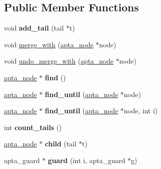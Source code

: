 \subsection*{Public Member Functions}
\begin{DoxyCompactItemize}
\item 
\mbox{\label{classapta__node_aeaf9c860199ae7118e0c4e3cafddcf0a}} 
void {\bfseries add\+\_\+tail} (tail $\ast$t)
\item 
void \hyperlink{classapta__node_aa7ad2ab5e24d47095eb7d7d60f2d1af4}{merge\+\_\+with} (\hyperlink{classapta__node}{apta\+\_\+node} $\ast$node)
\item 
void \hyperlink{classapta__node_aaaa403466a13fa9a8884c36a242ff49d}{undo\+\_\+merge\+\_\+with} (\hyperlink{classapta__node}{apta\+\_\+node} $\ast$node)
\item 
\mbox{\label{classapta__node_a5d339a47f63e54193f2d384244c8d61d}} 
\hyperlink{classapta__node}{apta\+\_\+node} $\ast$ {\bfseries find} ()
\item 
\mbox{\label{classapta__node_ad962ad1862c933737aa82263bb448686}} 
\hyperlink{classapta__node}{apta\+\_\+node} $\ast$ {\bfseries find\+\_\+until} (\hyperlink{classapta__node}{apta\+\_\+node} $\ast$node)
\item 
\mbox{\label{classapta__node_ad4ecd05d5b03c032fad2952670a78939}} 
\hyperlink{classapta__node}{apta\+\_\+node} $\ast$ {\bfseries find\+\_\+until} (\hyperlink{classapta__node}{apta\+\_\+node} $\ast$node, int i)
\item 
\mbox{\label{classapta__node_a6e650147d7fa55dde58063b4f380a5b3}} 
int {\bfseries count\+\_\+tails} ()
\item 
\mbox{\label{classapta__node_af647dfbf141d982ef5fcd8c0aff12f52}} 
\hyperlink{classapta__node}{apta\+\_\+node} $\ast$ {\bfseries child} (tail $\ast$t)
\item 
\mbox{\label{classapta__node_aa0d7c7f05be6d208c742e293dcfb2445}} 
apta\+\_\+guard $\ast$ {\bfseries guard} (int i, apta\+\_\+guard $\ast$g)
\item 
\mbox{\label{classapta__node_a917094db63252de689cefa7877159e5e}} 

\end{DoxyCompactItemize}
